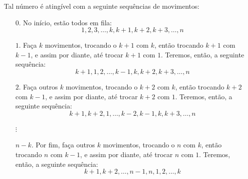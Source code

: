 \documentclass[10pt,a4paper]{scrartcl}
\begin{document}
\begin{sol}
		Tal número é atingível com a seguinte sequências de movimentos:
		\begin{itemize}
			\item[\(0\).] No início, estão todos em fila: \[
					1, 2, 3, \dots, k, k+1, k+2, k+3, \dots, n
			\]
		\item[\(1\).] Faça \(k\) movimentos, trocando o \(k+1\) com \(k\), então trocando \(k+1\) com \(k-1\), e assim por diante, até trocar \(k+1\) com \(1\). Teremos, então, a seguinte sequência: \[
			k+1, 1, 2, \dots, k-1, k, k+2, k + 3, \dots, n
		\]
		\item[\(2\).] Faça outros \(k\) movimentos, trocando o \(k+2\) com \(k\), então trocando \(k+2\) com \(k-1\), e assim por diante, até trocar \(k+2\) com \(1\). Teremos, então, a seguinte sequência: \[
			k+1, k+2, 1, \dots, k-2, k-1, k, k+3, \dots, n
		\]
		\item[\(\vdots\)]
		\item[\(n-k\).] Por fim, faça outros \(k\) movimentos, trocando o \(n\) com \(k\), então trocando \(n\) com \(k-1\), e assim por diante, até trocar \(n\) com \(1\). Teremos, então, a seguinte sequência: \[
			k+1, k+2, \dots, n-1, n, 1, 2, \dots, k
		\]
		\end{itemize}
	\end{sol}
\end{document}
